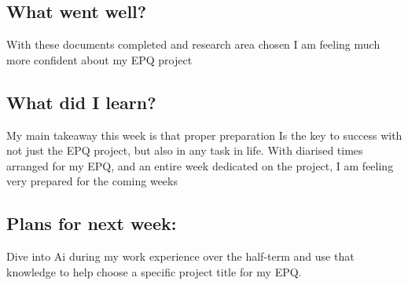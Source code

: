 \subsection*{What went well?}
With these documents completed and research area chosen I am feeling much more confident about my EPQ project

\subsection*{What did I learn?}
My main takeaway this week is that proper preparation Is the key to success with not just the EPQ project, but also in any task in life. With diarised times arranged for my EPQ, and an entire week dedicated on the project, I am feeling very prepared for the coming weeks

\subsection*{Plans for next week:}
Dive into Ai during my work experience over the half-term and use that knowledge to help choose a specific project title for my EPQ.

